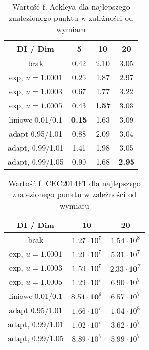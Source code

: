 \documentclass[12pt]{article}
\begin{document}
\begin{table}[ht]
	\centering
	\begin{tabular}{|c|c|c|c|}
		\hline
		DI / Dim         & 5             & 10            & 20            \\
		\hline
		brak             & 0.42          & 2.10          & 3.05          \\
		exp, $u=1.0001$  & 0.26          & 1.87          & 2.97          \\
		exp, $u=1.0003$  & 0.67          & 1.77          & 3.22          \\
		exp, $u=1.0005$  & 0.43          & \textbf{1.57} & 3.03          \\
		liniowe 0.01/0.1 & \textbf{0.15} & 1.63          & 3.09          \\
		adapt 0.95/1.01  & 0.88          & 2.09          & 3.04          \\
		adapt, 0.99/1.01 & 1.41          & 1.98          & 3.05          \\
		adapt, 0.99/1.05 & 0.90          & 1.68          & \textbf{2.95} \\
		\hline
	\end{tabular}
	\caption{Wartość f. Ackleya dla najlepszego znalezionego punktu w zależności od wymiaru}
	\label{tab:ackley_values}
\end{table}


\begin{table}[ht]
	\centering
	\begin{tabular}{|c|c|c|}
		\hline
		DI / Dim         & 10                         & 20                         \\
		\hline
		brak             & $1.27 \cdot 10^7$          & $1.54 \cdot 10^8$          \\
		exp, $u=1.0001$  & $1.21 \cdot 10^7$          & $5.31 \cdot 10^7$          \\
		exp, $u=1.0003$  & $1.59 \cdot 10^7$          & $\mathbf{2.33 \cdot 10^7}$ \\
		exp, $u=1.0005$  & $1.29 \cdot 10^7$          & $6.90 \cdot 10^7$          \\
		liniowe 0.01/0.1 & $\mathbf{8.54 \cdot 10^6}$ & $6.57 \cdot 10^7$          \\
		adapt 0.95/1.01  & $1.66 \cdot 10^7$          & $1.04 \cdot 10^8$          \\
		adapt, 0.99/1.01 & $1.02 \cdot 10^7$          & $3.62 \cdot 10^7$          \\
		adapt, 0.99/1.05 & $8.89 \cdot 10^6$          & $5.99 \cdot 10^7$          \\
		\hline
	\end{tabular}
	\caption{Wartość f. CEC2014F1 dla najlepszego znalezionego punktu w zależności od wymiaru}
	\label{tab:2014_comp}
\end{table}
\end{document}
